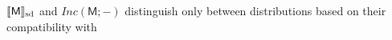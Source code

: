 \documentclass{article}
\theoremstyle{plain}
\theoremstyle{definition}
\theoremstyle{remark}
\DeclarePairedDelimiter{\SD}{\llbracket}{\rrbracket_{\text{sd}}}
\newcommand{\sfM}{\mathsf M}
\newcommand\inconsist{\mathit{Inc}}
\numberwithin{equation}{section}
\begin{document}
$\SD{\sfM}$ and $\inconsist(\sfM;-)$ distinguish only
        between distributions based on their compatibility with
% 
\end{document}
